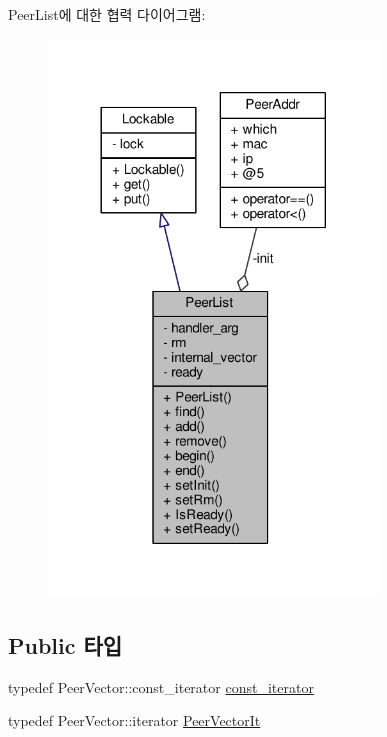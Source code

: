 Peer\+List에 대한 협력 다이어그램\+:
\nopagebreak
\begin{figure}[H]
\begin{center}
\leavevmode
\includegraphics[width=248pt]{class_peer_list__coll__graph}
\end{center}
\end{figure}
\subsection*{Public 타입}
\begin{DoxyCompactItemize}
\item 
typedef Peer\+Vector\+::const\+\_\+iterator \hyperlink{class_peer_list_a8f607ed0489ad703402dd51ac142b251}{const\+\_\+iterator}
\item 
typedef Peer\+Vector\+::iterator \hyperlink{class_peer_list_a5113d4c4c744b83b83d1b4cc1aa5152a}{Peer\+Vector\+It}
\end{DoxyCompactItemize}
